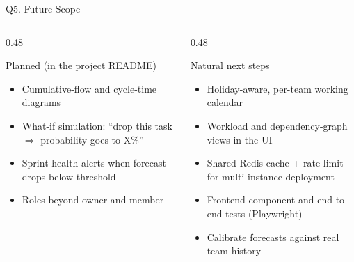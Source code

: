 \documentclass[11pt,aspectratio=169]{beamer}
\begin{document}
\begin{frame}{Q5. Future Scope}
  \begin{columns}[T]
    \begin{column}{0.48\textwidth}
      \begin{block}{Planned (in the project README)}
        \begin{itemize}\small
          \item Cumulative-flow and cycle-time diagrams
          \item What-if simulation: ``drop this task $\Rightarrow$ probability goes to X\%''
          \item Sprint-health alerts when forecast drops below threshold
          \item Roles beyond owner and member
        \end{itemize}
      \end{block}
    \end{column}
    \begin{column}{0.48\textwidth}
      \begin{block}{Natural next steps}
        \begin{itemize}\small
          \item Holiday-aware, per-team working calendar
          \item Workload and dependency-graph views in the UI
          \item Shared Redis cache + rate-limit for multi-instance deployment
          \item Frontend component and end-to-end tests (Playwright)
          \item Calibrate forecasts against real team history
        \end{itemize}
      \end{block}
    \end{column}
  \end{columns}
\end{frame}
\end{document}
